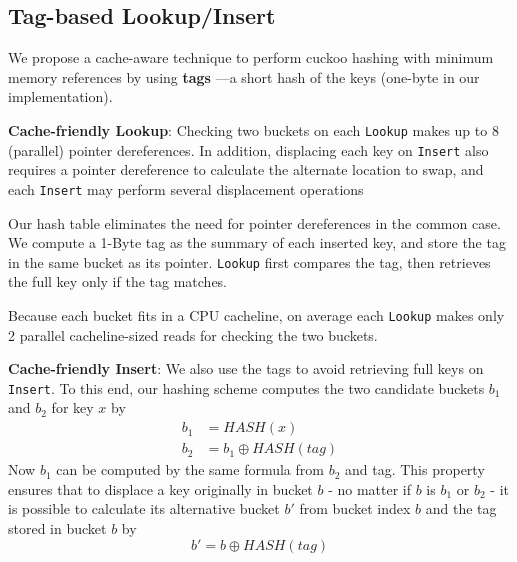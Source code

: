 \documentclass[11pt]{article}
\begin{document}
\subsection{Tag-based Lookup/Insert}
\label{sec:org9be56c5}
We propose a cache-aware technique to perform cuckoo hashing with minimum memory references by using
\textbf{tags} —a short hash of the keys (one-byte in our implementation).

\textbf{Cache-friendly Lookup}: Checking two buckets on each \texttt{Lookup} makes up to 8 (parallel) pointer
dereferences. In addition, displacing each key on \texttt{Insert} also requires a pointer dereference to
calculate the alternate location to swap, and each \texttt{Insert} may perform several displacement operations

Our hash table eliminates the need for pointer dereferences in the common case. We compute a 1-Byte
tag as the summary of each inserted key, and store the tag in the same bucket as its pointer. \texttt{Lookup}
first compares the tag, then retrieves the full key only if the tag matches.

Because each bucket fits in a CPU cacheline, on average each \texttt{Lookup} makes only 2 parallel
cacheline-sized reads for checking the two buckets.

\textbf{Cache-friendly Insert}: We also use the tags to avoid retrieving full keys on \texttt{Insert}. To this end, our
hashing scheme computes the two candidate buckets \(b_1\) and \(b_2\) for key \(x\) by
\begin{align*}
b_1&=HASH(x)\\
b_2&=b_1\oplus HASH(tag)
\end{align*}
Now \(b_1\) can be computed by the same formula from \(b_2\) and tag. This property ensures that to
displace a key originally in bucket \(b\) - no matter if \(b\) is \(b_1\) or \(b_2\) - it is possible
to calculate its alternative bucket \(b'\) from bucket index \(b\) and the tag stored in bucket \(b\)
by
\begin{equation*}
b'=b\oplus HASH(tag)
\end{equation*}
\end{document}
